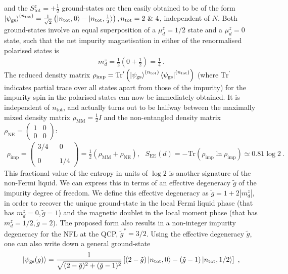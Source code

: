 \documentclass{iopart}
\begin{document}
and the \(S_\text{tot}^z = + \frac{1}{2}\) ground-states are then easily obtained to be of the form \(\ket{\psi_\text{gs}}^{(n_\text{tot})} = \frac{1}{\sqrt 2}\left(\ket{n_\text{tot}, 0} - \ket{n_\text{tot}, \frac{1}{2}}\right), n_\text{tot} = 2 ~\&~ 4\), independent of \(N\). Both ground-states involve an equal superposition of a \(\mu_d^z=1/2\) state and a \(\mu_d^z=0\) state, such that the net impurity magnetisation in either of the renormalised polarised states is
\begin{eqnarray}
	m_d^z = \frac{1}{2}\left( 0 + \frac{1}{2} \right) = \frac{1}{4}~.
\end{eqnarray}
The reduced density matrix \(\rho_\text{imp} = \text{Tr}^\prime\left(\ket{\psi_\text{gs}}^{(n_\text{tot})}\bra{\psi_\text{gs}}^{(n_\text{tot})}\right)\) (where \(\text{Tr}^\prime\) indicates partial trace over all states apart from those of the impurity) for the impurity spin in the polarised states can now be immediately obtained. It is independent of \(n_\text{tot}\), and actually turns out to be halfway between the maximally mixed density matrix \(\rho_\text{MM} = \frac{1}{2} I\) and the non-entangled density matrix \(\rho_\text{NE} = \begin{pmatrix} 1 & 0 \\ 0 & 0 \end{pmatrix} \):
\begin{eqnarray}
	\rho_\text{imp} = \begin{pmatrix} 3/4 && 0 \\ \\ 0 && 1/4 \end{pmatrix} = \frac{1}{2}\left(\rho_\text{MM} + \rho_\text{NE}\right), ~ ~ ~ S_\text{EE}(d) = -\text{Tr}\left(\rho_\text{imp} \ln \rho_\text{imp}\right) \simeq 0.81 \log 2 ~.
\end{eqnarray}
This fractional value of the entropy in units of \(\log 2\) is another signature of the non-Fermi liquid. We can express this in terms of an effective degeneracy \(\tilde g\) of the impurity degree of freedom. We define this effective degeneracy as \(\tilde g = 1 + 2|m_d^z|\), in order to recover the unique ground-state in the local Fermi liquid phase (that has \(m_d^z=0,\tilde g = 1\)) and the magnetic doublet in the local moment phase (that has \(m_d^z = 1/2, \tilde g =2\)). The proposed form also results in a non-integer impurity degeneracy for the NFL at the QCP, \(\tilde g^* = 3/2\). Using the effective degeneracy \(\tilde g\), one can also write down a general ground-state
\begin{eqnarray}\label{general-state}
	\ket{\psi_\text{gs}(g)} = \frac{1}{\sqrt{(2-\tilde g)^2 + (\tilde g-1)^2}}\left[(2-\tilde g)\ket{n_\text{tot},0} - (\tilde g - 1)\ket{n_\text{tot},1/2}\right]~,
\end{eqnarray}
\end{document}
